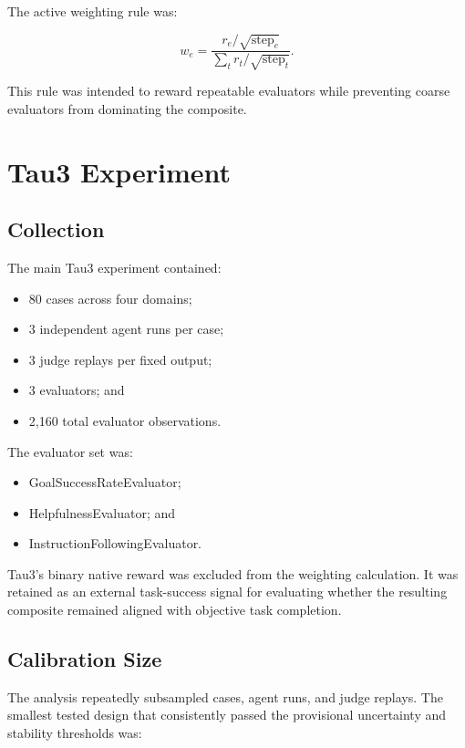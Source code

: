 \documentclass[11pt]{article}
\begin{document}
The active weighting rule was:

\begin{equation}
w_e =
\frac{r_e / \sqrt{\mathrm{step}_e}}
     {\sum_t r_t / \sqrt{\mathrm{step}_t}}.
\end{equation}

This rule was intended to reward repeatable evaluators while preventing
coarse evaluators from dominating the composite.

\section{Tau3 Experiment}

\subsection{Collection}

The main Tau3 experiment contained:

\begin{itemize}
    \item 80 cases across four domains;
    \item 3 independent agent runs per case;
    \item 3 judge replays per fixed output;
    \item 3 evaluators; and
    \item 2,160 total evaluator observations.
\end{itemize}

The evaluator set was:

\begin{itemize}
    \item GoalSuccessRateEvaluator;
    \item HelpfulnessEvaluator; and
    \item InstructionFollowingEvaluator.
\end{itemize}

Tau3's binary native reward was excluded from the weighting calculation. It
was retained as an external task-success signal for evaluating whether the
resulting composite remained aligned with objective task completion.

\subsection{Calibration Size}

The analysis repeatedly subsampled cases, agent runs, and judge replays. The
smallest tested design that consistently passed the provisional uncertainty
and stability thresholds was:
\end{document}
